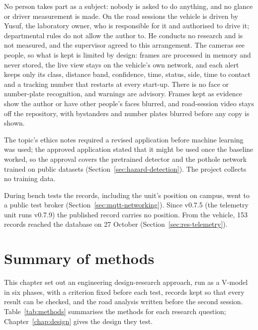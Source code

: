No person takes part as a subject: nobody is asked to do anything, and no glance or driver measurement is made. On the road sessions the vehicle is driven by Yusuf, the laboratory owner, who is responsible for it and authorised to drive it; departmental rules do not allow the author to. He conducts no research and is not measured, and the supervisor agreed to this arrangement. The cameras see people, so what is kept is limited by design: frames are processed in memory and never stored, the live view stays on the vehicle's own network, and each alert keeps only its class, distance band, confidence, time, status, side, time to contact and a tracking number that restarts at every start-up. There is no face or number-plate recognition, and warnings are advisory. Frames kept as evidence show the author or have other people's faces blurred, and road-session video stays off the repository, with bystanders and number plates blurred before any copy is shown.

The topic's ethics notes required a revised application before machine learning was used; the approved application stated that it might be used once the baseline worked, so the approval covers the pretrained detector and the pothole network trained on public datasets (Section~\ref{sec:hazard-detection}). The project collects no training data.

During bench tests the records, including the unit's position on campus, went to a public test broker (Section~\ref{sec:mqtt-networking}). Since v0.7.5 (the telemetry unit runs v0.7.9) the published record carries no position. From the vehicle, 153 records reached the database on 27 October (Section~\ref{sec:res-telemetry}).

\section{Summary of methods}
\label{sec:methods-summary}

This chapter set out an engineering design-research approach, run as a V-model in six phases, with a criterion fixed before each test, records kept so that every result can be checked, and the road analysis written before the second session. Table~\ref{tab:methods} summarises the methods for each research question; Chapter~\ref{chap:design} gives the design they test.

